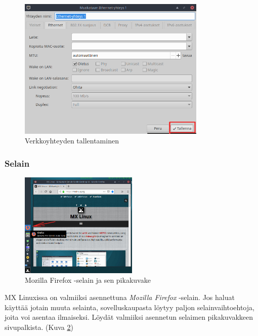 \documentclass[a4paper, 12pt, finnish]{article}
\begin{document}
\begin{figure}[htpb]
    \begin{center}
        \includegraphics[width=0.8\textwidth]{internet/yhteys_tallenna}
        \caption{Verkkoyhteyden tallentaminen}
        \label{fig:connection}
    \end{center}
\end{figure}

\subsubsection{Selain}
\begin{figure}
  \begin{center}
    \includegraphics[width=0.5\textwidth]{internet/firefox}
  \end{center}
  \vspace*{-3mm}
  \caption{Mozilla Firefox -selain ja sen pikakuvake}
  \label{fig:firefox}
\end{figure}

MX Linuxissa on valmiiksi asennettuna \textit{Mozilla Firefox} -selain. Jos haluat käyttää jotain muuta selainta, sovelluskaupasta löytyy paljon selainvaihtoehtoja, joita voi asentaa ilmaiseksi.
Löydät valmiiksi asennetun selaimen pikakuvakkeen sivupalkista. (Kuva \ref{fig:firefox})
\end{document}
